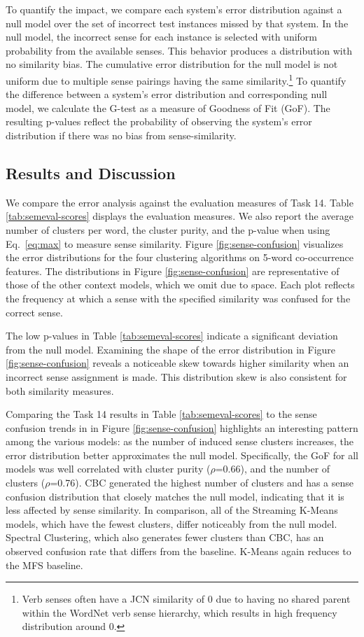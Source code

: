 \documentclass[11pt]{article}
\begin{document}
To quantify the impact, we compare each system's error distribution against a
null model over the set of incorrect test instances missed by that system.  In
the null model, the incorrect sense for each instance is selected with uniform
probability from the available senses.  This behavior produces a distribution
with no similarity bias.  The cumulative error distribution for the null model
is not uniform due to multiple sense pairings having the same
similarity.\footnote{Verb senses often have a JCN similarity of 0 due to having
  no shared parent within the WordNet verb sense hierarchy, which results in
  high frequency distribution around 0.}  To quantify the difference between a
system's error distribution and corresponding null model, we calculate the
G-test as a measure of Goodness of Fit (GoF).  The resulting p-values reflect
the probability of observing the system's error distribution if there was no
bias from sense-similarity.


\subsection{Results and Discussion}

We compare the error analysis against the evaluation measures of Task 14.  Table
\ref{tab:semeval-scores} displays the evaluation measures.  We also report the
average number of clusters per word, the cluster purity, and the p-value when
using Eq.\ \ref{eq:max} to measure sense similarity.
%
Figure \ref{fig:sense-confusion} visualizes the error distributions for the four
clustering algorithms on 5-word co-occurrence features.  The distributions in
Figure \ref{fig:sense-confusion} are representative of those of the other
context models, which we omit due to space.  Each plot reflects the frequency at
which a sense with the specified similarity was confused for the correct sense.

The low p-values in Table \ref{tab:semeval-scores} indicate a significant
deviation from the null model.  Examining the shape of the error distribution in
Figure \ref{fig:sense-confusion} reveals a noticeable skew towards higher
similarity when an incorrect sense assignment is made.  This distribution skew
is also consistent for both similarity measures.

Comparing the Task 14 results in Table \ref{tab:semeval-scores} to the sense
confusion trends in in Figure \ref{fig:sense-confusion} highlights an
interesting pattern among the various models: as the number of induced sense
clusters increases, the error distribution better approximates the null model.
%
Specifically, the GoF for all models was well correlated with cluster purity
($\rho$=0.66), and the number of clusters ($\rho$=0.76).
CBC generated the highest number of clusters and has a sense confusion
distribution that closely matches the null model, indicating that it is less
affected by sense similarity.
In comparison, all of the Streaming K-Means models, which have the fewest
clusters, differ noticeably from the null model.  Spectral Clustering, which
also generates fewer clusters than CBC, has an observed confusion rate that
differs from the baseline.  K-Means again reduces to the MFS baseline.
\end{document}
